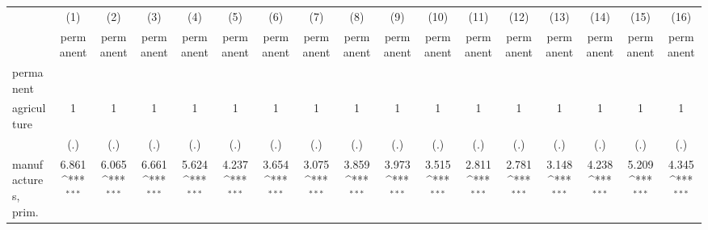 {
\def\sym#1{\ifmmode^{#1}\else\(^{#1}\)\fi}
\begin{tabular}{l*{16}{c}}
\hline\hline
                    &\multicolumn{1}{c}{(1)}&\multicolumn{1}{c}{(2)}&\multicolumn{1}{c}{(3)}&\multicolumn{1}{c}{(4)}&\multicolumn{1}{c}{(5)}&\multicolumn{1}{c}{(6)}&\multicolumn{1}{c}{(7)}&\multicolumn{1}{c}{(8)}&\multicolumn{1}{c}{(9)}&\multicolumn{1}{c}{(10)}&\multicolumn{1}{c}{(11)}&\multicolumn{1}{c}{(12)}&\multicolumn{1}{c}{(13)}&\multicolumn{1}{c}{(14)}&\multicolumn{1}{c}{(15)}&\multicolumn{1}{c}{(16)}\\
                    &\multicolumn{1}{c}{permanent}&\multicolumn{1}{c}{permanent}&\multicolumn{1}{c}{permanent}&\multicolumn{1}{c}{permanent}&\multicolumn{1}{c}{permanent}&\multicolumn{1}{c}{permanent}&\multicolumn{1}{c}{permanent}&\multicolumn{1}{c}{permanent}&\multicolumn{1}{c}{permanent}&\multicolumn{1}{c}{permanent}&\multicolumn{1}{c}{permanent}&\multicolumn{1}{c}{permanent}&\multicolumn{1}{c}{permanent}&\multicolumn{1}{c}{permanent}&\multicolumn{1}{c}{permanent}&\multicolumn{1}{c}{permanent}\\
\hline
permanent           &                     &                     &                     &                     &                     &                     &                     &                     &                     &                     &                     &                     &                     &                     &                     &                     \\
agriculture         &           1         &           1         &           1         &           1         &           1         &           1         &           1         &           1         &           1         &           1         &           1         &           1         &           1         &           1         &           1         &           1         \\
                    &         (.)         &         (.)         &         (.)         &         (.)         &         (.)         &         (.)         &         (.)         &         (.)         &         (.)         &         (.)         &         (.)         &         (.)         &         (.)         &         (.)         &         (.)         &         (.)         \\
[1em]
manufactures, prim. &       6.861\sym{***}&       6.065\sym{***}&       6.661\sym{***}&       5.624\sym{***}&       4.237\sym{***}&       3.654\sym{***}&       3.075\sym{***}&       3.859\sym{***}&       3.973\sym{***}&       3.515\sym{***}&       2.811\sym{***}&       2.781\sym{***}&       3.148\sym{***}&       4.238\sym{***}&       5.209\sym{***}&       4.345\sym{***}\\

\end{tabular}}
